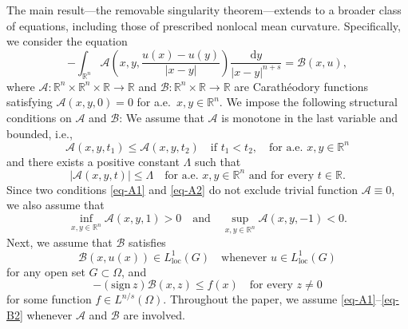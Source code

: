 \documentclass{amsart}
\theoremstyle{plain}
\theoremstyle{definition}
\numberwithin{equation}{section}
\begin{document}
The main result---the removable singularity theorem---extends to a broader class of equations, including those of prescribed nonlocal mean curvature. Specifically, we consider the equation
\begin{equation}\label{eq-main}
- \int_{\mathbb{R}^n} \mathscr{A}\left( x, y, \frac{u(x)-u(y)}{|x-y|} \right) \frac{\mathrm{d}y}{|x-y|^{n+s}} = \mathscr{B}(x, u),
\end{equation}
where $\mathscr{A}: \mathbb{R}^n \times \mathbb{R}^n \times \mathbb{R} \to \mathbb{R}$ and $\mathscr{B}: \mathbb{R}^n \times \mathbb{R} \to \mathbb{R}$ are Carath\'eodory functions satisfying $\mathscr{A}(x, y, 0)=0$ for a.e.\ $x, y \in \mathbb{R}^n$. We impose the following structural conditions on $\mathscr{A}$ and $\mathscr{B}$: We assume that $\mathscr{A}$ is monotone in the last variable and bounded, i.e.,
\begin{equation}\label{eq-A1}
\mathscr{A}(x, y, t_1) \leq \mathscr{A}(x, y, t_2) \quad\text{if }t_1<t_2, \quad \text{for a.e.\ $x, y \in \mathbb{R}^n$}
\end{equation}
and there exists a positive constant $\Lambda$ such that
\begin{equation}\label{eq-A2}
|\mathscr{A}(x, y, t)| \leq \Lambda \quad\text{for a.e.\ $x, y \in \mathbb{R}^n$ and for every $t \in \mathbb{R}$}.
\end{equation}
Since two conditions \eqref{eq-A1} and \eqref{eq-A2} do not exclude trivial function $\mathscr{A} \equiv 0$, we also assume that
\begin{equation}\label{eq-A3}
\inf_{x, y \in \mathbb{R}^n} \mathscr{A}(x, y, 1) > 0 \quad\text{and}\quad \sup_{x, y \in \mathbb{R}^n} \mathscr{A}(x, y, -1) < 0.
\end{equation}
Next, we assume that $\mathscr{B}$ satisfies
\begin{equation}\label{eq-B1}
\mathscr{B}(x, u(x)) \in L^1_{\mathrm{loc}}(G) \quad\text{whenever } u \in L^1_{\mathrm{loc}}(G)
\end{equation}
for any open set $G \subset \Omega$, and
\begin{equation}\label{eq-B2}
-(\mathrm{sign}\,z) \mathscr{B}(x, z) \leq f(x) \quad\text{for every } z \neq 0
\end{equation}
for some function $f \in L^{n/s}(\Omega)$. Throughout the paper, we assume \eqref{eq-A1}--\eqref{eq-B2} whenever $\mathscr{A}$ and $\mathscr{B}$ are involved.
\end{document}
